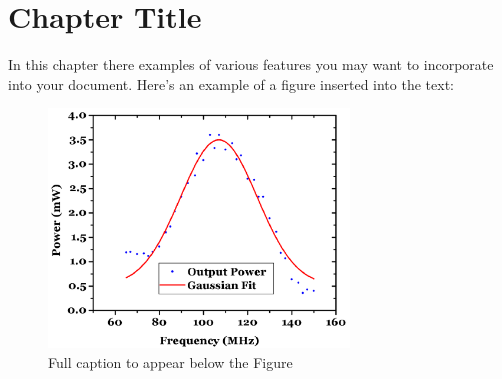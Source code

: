 
\cleardoublepage


\chapter{Chapter Title}
\label{makereference1}

In this chapter there examples of various features you may want to
incorporate into your document. Here's an example of a figure
inserted into the text:

\begin{figure}[htb]%

    \includegraphics[height=2.5in]{figures/graph.png}

    \caption[Optional: Short caption to appear in List of
    Figures]{Full caption to appear below the Figure}

    \label{figure1}
\end{figure}


